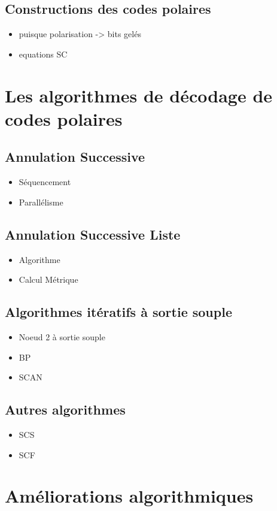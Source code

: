 \subsection{Constructions des codes polaires}
\begin{itemize}
\item puisque polarisation -> bits gelés
\item equations SC
\end{itemize}

\section{Les algorithmes de décodage de codes polaires}

\subsection{Annulation Successive}
\begin{itemize}
\item Séquencement
\item Parallélisme
\end{itemize}
\subsection{Annulation Successive Liste}
\begin{itemize}
\item Algorithme
\item Calcul Métrique

\end{itemize}
\subsection{Algorithmes itératifs à sortie souple}
\begin{itemize}
\item Noeud 2 à sortie souple
\item BP
\item SCAN
\end{itemize}

\subsection{Autres algorithmes}
\begin{itemize}
	\item SCS
	\item SCF
\end{itemize}
\section{Améliorations algorithmiques}

